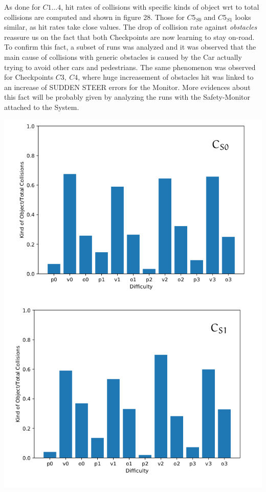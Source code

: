 As done for $C1\dots 4$, hit rates of collisions with specific kinds of object wrt to total collisions are computed and shown in figure 28. Those for $C5_{S0}$ and $C5_{S1}$ looks similar, as hit rates take close values. The drop of collision rate against \textsl{obstacles} reassure us on the fact that both Checkpoints are now learning to stay on-road. To confirm this fact, a subset of runs was analyzed and it was observed that the main cause of collisions with generic obstacles is caused by the Car actually trying to avoid other cars and pedestrians. The same phenomenon was observed for Checkpoints $C3,\: C4$, where huge increasement of obstacles hit was linked to an increase of SUDDEN STEER errors for the Monitor.
More evidences about this fact will be probably given by analyzing the runs with the Safety-Monitor attached to the System.


\begin{minipage}[c]{\textwidth}
	\includegraphics[width=\textwidth]{img/hit-ratios-stupid-pro.png}
\end{minipage}


